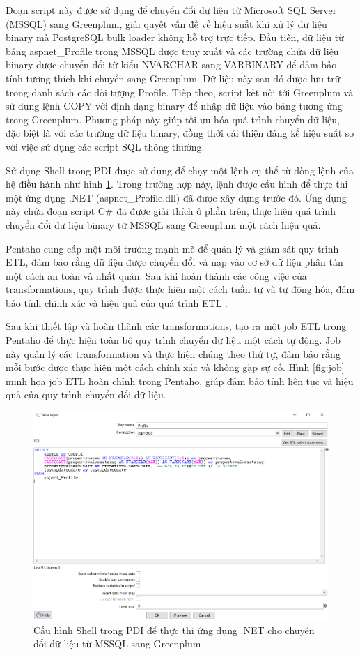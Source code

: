 \documentclass{article}[14pt]
\begin{document}
Đoạn script này được sử dụng để chuyển đổi dữ liệu từ Microsoft SQL Server (MSSQL) sang Greenplum, giải quyết vấn đề về hiệu suất khi xử lý dữ liệu binary mà PostgreSQL bulk loader không hỗ trợ trực tiếp. Đầu tiên, dữ liệu từ bảng aspnet\_Profile trong MSSQL được truy xuất và các trường chứa dữ liệu binary được chuyển đổi từ kiểu NVARCHAR sang VARBINARY để đảm bảo tính tương thích khi chuyển sang Greenplum. Dữ liệu này sau đó được lưu trữ trong danh sách các đối tượng Profile. Tiếp theo, script kết nối tới Greenplum và sử dụng lệnh COPY với định dạng binary để nhập dữ liệu vào bảng tương ứng trong Greenplum. Phương pháp này giúp tối ưu hóa quá trình chuyển dữ liệu, đặc biệt là với các trường dữ liệu binary, đồng thời cải thiện đáng kể hiệu suất so với việc sử dụng các script SQL thông thường.

Sử dụng Shell trong PDI được sử dụng để chạy một lệnh cụ thể từ dòng lệnh của hệ điều hành như hình \ref{fig:aspnetProfile}. Trong trường hợp này, lệnh được cấu hình để thực thi một ứng dụng .NET (aspnet\_Profile.dll) đã được xây dựng trước đó. Ứng dụng này chứa đoạn script C\# đã được giải thích ở phần trên, thực hiện quá trình chuyển đổi dữ liệu binary từ MSSQL sang Greenplum một cách hiệu quả.


Pentaho cung cấp một môi trường mạnh mẽ để quản lý và giám sát quy trình ETL, đảm bảo rằng dữ liệu được chuyển đổi và nạp vào cơ sở dữ liệu phân tán một cách an toàn và nhất quán. Sau khi hoàn thành các công việc của transformations, quy trình được thực hiện một cách tuần tự và tự động hóa, đảm bảo tính chính xác và hiệu quả của quá trình ETL .


Sau khi thiết lập và hoàn thành các transformations, 
 tạo ra một job ETL trong Pentaho để thực hiện toàn bộ quy trình chuyển dữ liệu một cách tự động. Job này quản lý các transformation và thực hiện chúng theo thứ tự, đảm bảo rằng mỗi bước được thực hiện một cách chính xác và không gặp sự cố. Hình \ref{fig:job} minh họa job ETL hoàn chỉnh trong Pentaho, giúp đảm bảo tính liên tục và hiệu quả của quy trình chuyển đổi dữ liệu.


\begin{figure}
    \centering
    \includegraphics[width=0.8\linewidth]{images/profile.png}
    \caption{Cấu hình Shell trong PDI để thực thi ứng dụng .NET cho chuyển đổi dữ liệu từ MSSQL sang Greenplum}
    \label{fig:aspnetProfile}
\end{figure}
\end{document}
